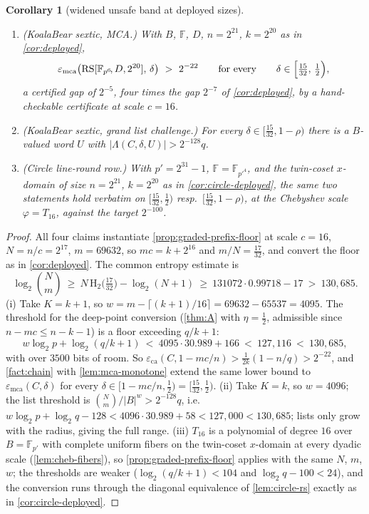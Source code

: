 \documentclass[11pt]{article}
\newtheorem{corollary}[corollary]{Corollary}
\theoremstyle{definition}
\theoremstyle{remark}
\newcommand{\F}{\mathbb{F}}
\newcommand{\B}{B}
\newcommand{\RS}{\mathrm{RS}}
\newcommand{\eca}{\varepsilon_{\mathrm{ca}}}
\newcommand{\emca}{\varepsilon_{\mathrm{mca}}}
\newcommand{\Lst}{\Lambda}
\newcommand{\Hb}{\mathrm{H}_2}
\begin{document}
\begin{corollary}[widened unsafe band at deployed sizes]\label{cor:widened-deployed}
\begin{enumerate}[label=\textup{(\roman*)}]
\item \textup{(KoalaBear sextic, MCA.)} With $\B$, $\F$, $D$, $n=2^{21}$, $k=2^{20}$ as in \cref{cor:deployed},
\[
\emca\bigl(\RS[\F_{p^6}\!,D,2^{20}],\,\delta\bigr)\ >\ 2^{-22}
\qquad\text{for every}\qquad
\delta\in\Bigl[\tfrac{15}{32},\,\tfrac12\Bigr),
\]
a certified gap of $2^{-5}$, four times the gap $2^{-7}$ of \cref{cor:deployed}, by a hand-checkable certificate at scale $c=16$.
\item \textup{(KoalaBear sextic, grand list challenge.)} For every $\delta\in[\tfrac{15}{32},1-\rho)$ there is a $\B$-valued word $U$ with $|\Lst(C,\delta,U)|>2^{-128}q$.
\item \textup{(Circle line-round row.)} With $p'=2^{31}-1$, $\F=\F_{p'^4}$, and the twin-coset $x$-domain of size $n=2^{21}$, $k=2^{20}$ as in \cref{cor:circle-deployed}, the same two statements hold verbatim on $[\tfrac{15}{32},\tfrac12)$ resp.\ $[\tfrac{15}{32},1-\rho)$, at the Chebyshev scale $\varphi=T_{16}$, against the target $2^{-100}$.
\end{enumerate}
\end{corollary}

\begin{proof}
All four claims instantiate \cref{prop:graded-prefix-floor} at scale $c=16$, $N=n/c=2^{17}$, $m=69632$, so $mc=k+2^{16}$ and $m/N=\tfrac{17}{32}$, and convert the floor as in \cref{cor:deployed}. The common entropy estimate is
\[
\log_2\binom{N}{m}\ \ge\ N\,\Hb\bigl(\tfrac{17}{32}\bigr)-\log_2(N+1)\ \ge\ 131072\cdot0.99718-17\ >\ 130{,}685 .
\]
\textup{(i)} Take $K=k+1$, so $w=m-\lceil(k+1)/16\rceil=69632-65537=4095$. The threshold for the deep-point conversion (\cref{thm:A} with $\eta=\tfrac12$, admissible since $n-mc\le n-k-1$) is a floor exceeding $q/k+1$:
\[
w\log_2p+\log_2(q/k+1)\ <\ 4095\cdot30.989+166\ <\ 127{,}116\ <\ 130{,}685 ,
\]
with over $3500$ bits of room. So $\eca(C,1-mc/n)>\tfrac1{2k}(1-n/q)>2^{-22}$, and \cref{fact:chain} with \cref{lem:mca-monotone} extend the same lower bound to $\emca(C,\delta)$ for every $\delta\in[1-mc/n,\tfrac12)=[\tfrac{15}{32},\tfrac12)$.
\textup{(ii)} Take $K=k$, so $w=4096$; the list threshold is $\binom Nm/|\B|^w>2^{-128}q$, i.e.\ $w\log_2p+\log_2q-128<4096\cdot30.989+58<127{,}000<130{,}685$; lists only grow with the radius, giving the full range.
\textup{(iii)} $T_{16}$ is a polynomial of degree $16$ over $\B=\F_{p'}$ with complete uniform fibers on the twin-coset $x$-domain at every dyadic scale (\cref{lem:cheb-fibers}), so \cref{prop:graded-prefix-floor} applies with the same $N$, $m$, $w$; the thresholds are weaker ($\log_2(q/k+1)<104$ and $\log_2q-100<24$), and the conversion runs through the diagonal equivalence of \cref{lem:circle-rs} exactly as in \cref{cor:circle-deployed}.
\end{proof}
\end{document}
